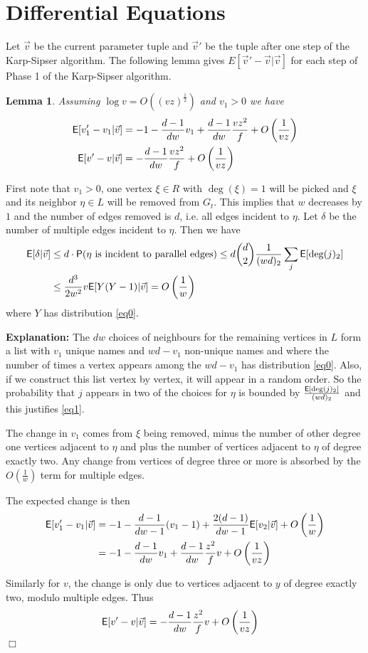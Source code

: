\documentclass[11pt]{article}
\newcommand{\half}{\frac{1}{2}}
\newenvironment{proof}{{\bf Proof:}}{\hfill\mbox{$\Box$}}
\def\d{\delta}
\def\E{{\sf E}}
\def\Pr{{\sf P}}
\def\vv{\vec{v}}
\newtheorem{lemma}[theorem]{Lemma}
\newcommand{\brac}[1]{\left(#1\right)}
\newcommand{\bfrac}[2]{\brac{\frac{#1}{#2}}}
\begin{document}
\section{Differential Equations}\label{diffeqs}
Let $\vv$ be the current parameter tuple and $\vv'$ be the tuple after one step of the Karp-Sipser algorithm. The following
lemma gives $E[\vv'-\vv|\vv]$ for each step of Phase 1 of the Karp-Sipser algorithm.
\begin{lemma}\label{change}
Assuming $\log v = O((vz)^\half)$ and $v_1>0$ we have
\begin{align*}
\E[v_1'-v_1 | \vv] &= -1 - \frac{d-1}{dw}v_1 + \frac{d-1}{dw}\frac{vz^2}{f} + O\bfrac{1}{vz} \\
\E[v'-v | \vv] &= -\frac{d-1}{dw}\frac{vz^2}{f} + O\bfrac{1}{vz}
\end{align*}
\end{lemma}
\begin{proof}
  First note that $v_1>0$, one vertex $\xi\in R$ with $\deg(\xi) = 1$ will
  be picked and $\xi$ and its neighbor $\eta\in L$ will be removed from
  $G_t$. This implies that $w$ decreases by $1$ and the number of
  edges removed is $d$, i.e. all edges incident to $\eta$. Let $\d$ be
  the number of multiple edges incident to $\eta$. Then we have
\begin{align}
\E[\d | \vv] &\le d\cdot \Pr(\eta \text{ is incident to parallel edges}) \le d \binom{d}{2} \frac{1}{(wd)_2}\sum_{j}\E[\deg(j)_2]\label{eq1}\\
&\le \frac{d^3}{2w^2}v\E[Y(Y-1) | \vv] = O\bfrac{1}{w}\nonumber
\end{align}
where $Y$ has distribution \eqref{eq0}.

{\bf Explanation:}
The $dw$ choices of neighbours for the remaining vertices in $L$ form a list with $v_1$ unique names and $wd-v_1$ non-unique
names and where the number of times a vertex appears among the $wd-v_1$ has distribution \eqref{eq0}. Also, if we construct this 
list vertex by vertex, it will appear in a random order. So the probability that $j$ appears in two of the choices for 
$\eta$ is bounded by $\frac{\E[\deg(j)_2]}{(wd)_2}$ and this justifies \eqref{eq1}.

The change in $v_1$ comes from $\xi$ being removed, minus the number of 
other degree one vertices adjacent to $\eta$ and plus the number of vertices
adjacent to $\eta$ of degree exactly two. Any change from vertices of degree three
or more is absorbed by the $O\bfrac{1}{w}$ term for multiple edges.

The expected change is then
\begin{align}
\E[v_1'-v_1 | \vv] &= -1 -\frac{d-1}{dw-1}(v_1-1) + \frac{2(d-1)}{dw-1}\E[v_2 | \vv] + O\bfrac{1}{w}\nonumber\\
&= -1 -\frac{d-1}{dw}v_1 + \frac{d-1}{dw}\frac{z^2}{f}v + O\bfrac{1}{vz} \label{v1cc}
\end{align}

Similarly for $v$, the change is only due to vertices adjacent to $y$ of degree exactly two, modulo multiple edges. Thus
\begin{align*}
\E[v'-v | \vv] &= -\frac{d-1}{dw}\frac{z^2}{f}v + O\bfrac{1}{vz}
\end{align*}
\end{proof}
\end{document}
